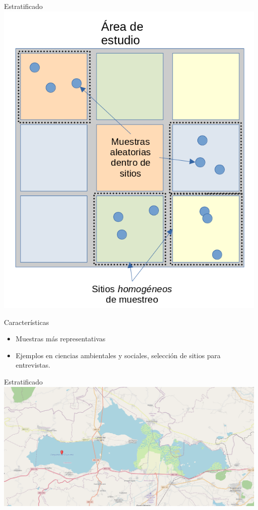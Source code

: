 \documentclass[
  11pt,
  ignorenonframetext,
]{beamer}
\begin{document}
\begin{frame}{Estratificado}
\protect\hypertarget{estratificado}{}
\includegraphics{Figuras-tecnicas/Estratificado.png}
\end{frame}

\begin{frame}{Características}
\protect\hypertarget{caracteruxedsticas}{}
\begin{itemize}
\item
  Muestras más representativas
\item
  Ejemplos en ciencias ambientales y sociales, selección de sitios para
  entrevistas.
\end{itemize}
\end{frame}

\begin{frame}{Estratificado}
\protect\hypertarget{estratificado-1}{}
\includegraphics{Figuras-tecnicas/Cuitzeo.png}
\end{frame}
\end{document}
